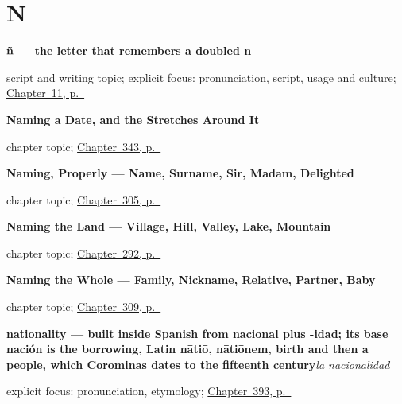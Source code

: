 \section*{N}

\noindent\begin{minipage}[t]{\linewidth}
\raggedright
\textbf{ñ — the letter that remembers a doubled n}\par
\footnotesize script and writing topic; explicit focus: pronunciation, script, usage and culture; \hyperref[ch:enye-and-marks]{Chapter~11, p.~\pageref*{ch:enye-and-marks}}
\end{minipage}\par\smallskip

\noindent\begin{minipage}[t]{\linewidth}
\raggedright
\textbf{Naming a Date, and the Stretches Around It}\par
\footnotesize chapter topic; \hyperref[ch:la-fecha-y-el-siglo]{Chapter~343, p.~\pageref*{ch:la-fecha-y-el-siglo}}
\end{minipage}\par\smallskip

\noindent\begin{minipage}[t]{\linewidth}
\raggedright
\textbf{Naming, Properly --- Name, Surname, Sir, Madam, Delighted}\par
\footnotesize chapter topic; \hyperref[ch:nombre-y-apellido]{Chapter~305, p.~\pageref*{ch:nombre-y-apellido}}
\end{minipage}\par\smallskip

\noindent\begin{minipage}[t]{\linewidth}
\raggedright
\textbf{Naming the Land --- Village, Hill, Valley, Lake, Mountain}\par
\footnotesize chapter topic; \hyperref[ch:la-tierra]{Chapter~292, p.~\pageref*{ch:la-tierra}}
\end{minipage}\par\smallskip

\noindent\begin{minipage}[t]{\linewidth}
\raggedright
\textbf{Naming the Whole --- Family, Nickname, Relative, Partner, Baby}\par
\footnotesize chapter topic; \hyperref[ch:familia-y-pareja]{Chapter~309, p.~\pageref*{ch:familia-y-pareja}}
\end{minipage}\par\smallskip

\noindent\begin{minipage}[t]{\linewidth}
\raggedright
\textbf{nationality — built inside Spanish from nacional plus -idad; its base nación is the borrowing, Latin nātiō, nātiōnem, birth and then a people, which Corominas dates to the fifteenth century}\enspace\emph{la nacionalidad}\par
\footnotesize explicit focus: pronunciation, etymology; \hyperref[ch:el-ordenador-y-el-correo-electronico]{Chapter~393, p.~\pageref*{ch:el-ordenador-y-el-correo-electronico}}
\end{minipage}\par\smallskip

